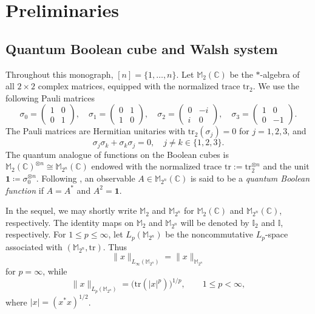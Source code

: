 \documentclass{amsbook}
\theoremstyle{definition}
\theoremstyle{remark}
\numberwithin{section}{chapter}
\numberwithin{equation}{chapter}
\newcommand{\M}{\mathbb{M}}
\newcommand{\1}{\mathbf{1}}
\newcommand{\tr}{\mathrm{tr}}
\begin{document}
\chapter{Preliminaries}\label{sec-2}
\section{Quantum Boolean cube and Walsh system}\label{quantum-notations}

Throughout this monograph, $[n]=\{1,\ldots,n\}$.  Let $\M_{2}(\mathbb{C})$ be the $*$-algebra of all $2\times2$ complex matrices, equipped with the normalized trace $\tr_{2}$.  We use the following Pauli matrices
\[
\sigma_0 = \begin{pmatrix} 1 & 0 \\ 0 & 1 \end{pmatrix}, \quad
\sigma_1 = \begin{pmatrix} 0 & 1 \\ 1 & 0 \end{pmatrix}, \quad
\sigma_2 = \begin{pmatrix} 0 & -i \\ i & 0 \end{pmatrix}, \quad
\sigma_3 = \begin{pmatrix} 1 & 0 \\ 0 & -1 \end{pmatrix}.
\]
The Pauli matrices are Hermitian unitaries with $\tr_2(\sigma_j)=0$ for $j=1,2,3$, and
\begin{equation}\label{car-relation}
\sigma_j\sigma_k+\sigma_k\sigma_j=0,\quad  j\neq k \in \{1,2,3\}. 
\end{equation}
The quantum analogue of functions on the Boolean cubes is $\mathbb{M}_2(\mathbb{C})^{\otimes n}\cong\mathbb{M}_{2^n}(\mathbb{C})$ endowed with the normalized trace $\mathrm{tr}:=\mathrm{tr}_2^{\otimes n}$ and the unit $\mathbf{1}\coloneqq \sigma_{0}^{\otimes n}$. Following \cite[Definition 3.1]{MO2010}, an observable $A\in\mathbb{M}_{2^n}(\mathbb{C})$ is said to be a \emph{quantum Boolean function} if $A=A^*$ and $A^2=\mathbf{1}$. 

In the sequel, we may shortly write  $\mathbb{M}_2$ and $\mathbb{M}_{2^n}$ for $\mathbb{M}_2(\mathbb{C})$ and $\mathbb{M}_{2^n}(\mathbb{C})$, respectively. The identity maps on $\mathbb{M}_2$ and $\mathbb{M}_{2^n}$ will be denoted by $\mathbb{I}_2$ and $\mathbb{I}$, respectively. For $1\le p\le\infty$, let $L_p(\M_{2^n})$ be the noncommutative $L_p$-space associated with $(\M_{2^n},\tr)$.  Thus
\[
 \|x\|_{L_\infty(\M_{2^n})}=\|x\|_{\M_{2^n}}
\]
for $p=\infty$, while
\[
 \|x\|_{L_p(\M_{2^n})}=\bigl(\tr(|x|^p)\bigr)^{1/p},\qquad 1\le p<\infty,
\]
where $|x|=(x^*x)^{1/2}$.
\end{document}
